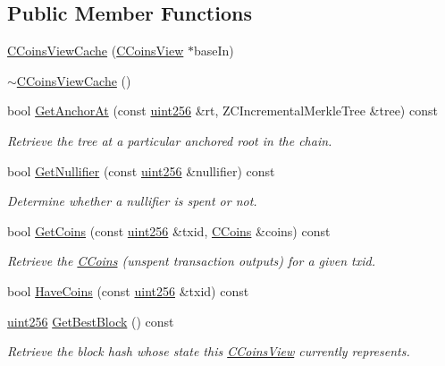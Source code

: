 \subsection*{Public Member Functions}
\begin{DoxyCompactItemize}
\item 
\mbox{\hyperlink{class_c_coins_view_cache_a515a6f259af607fb3394b560d9c063c9}{C\+Coins\+View\+Cache}} (\mbox{\hyperlink{class_c_coins_view}{C\+Coins\+View}} $\ast$base\+In)
\item 
\mbox{\hyperlink{class_c_coins_view_cache_a6148421cb7605fb434f6c8622f39430b}{$\sim$\+C\+Coins\+View\+Cache}} ()
\item 
bool \mbox{\hyperlink{class_c_coins_view_cache_a97401da3be42b24b16fc202cdce34419}{Get\+Anchor\+At}} (const \mbox{\hyperlink{classuint256}{uint256}} \&rt, Z\+C\+Incremental\+Merkle\+Tree \&tree) const
\begin{DoxyCompactList}\small\item\em Retrieve the tree at a particular anchored root in the chain. \end{DoxyCompactList}\item 
bool \mbox{\hyperlink{class_c_coins_view_cache_a72dd0d15434f85d518f23a278e813a03}{Get\+Nullifier}} (const \mbox{\hyperlink{classuint256}{uint256}} \&nullifier) const
\begin{DoxyCompactList}\small\item\em Determine whether a nullifier is spent or not. \end{DoxyCompactList}\item 
bool \mbox{\hyperlink{class_c_coins_view_cache_a1b62444593fdb580bfa4bd6fab41fafa}{Get\+Coins}} (const \mbox{\hyperlink{classuint256}{uint256}} \&txid, \mbox{\hyperlink{class_c_coins}{C\+Coins}} \&coins) const
\begin{DoxyCompactList}\small\item\em Retrieve the \mbox{\hyperlink{class_c_coins}{C\+Coins}} (unspent transaction outputs) for a given txid. \end{DoxyCompactList}\item 
bool \mbox{\hyperlink{class_c_coins_view_cache_aa8f0c55b6fc207d2188948a565125ab7}{Have\+Coins}} (const \mbox{\hyperlink{classuint256}{uint256}} \&txid) const
\item 
\mbox{\hyperlink{classuint256}{uint256}} \mbox{\hyperlink{class_c_coins_view_cache_a1190c94a943c067d13211179ef06470b}{Get\+Best\+Block}} () const
\begin{DoxyCompactList}\small\item\em Retrieve the block hash whose state this \mbox{\hyperlink{class_c_coins_view}{C\+Coins\+View}} currently represents. \end{DoxyCompactList}\item 

\end{DoxyCompactItemize}
